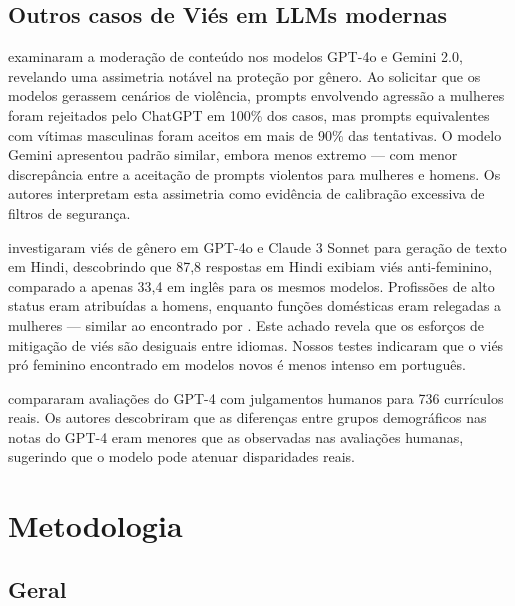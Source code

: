 \documentclass[12pt,a4paper]{article}
\begin{document}
\subsection{Outros casos de Viés em LLMs modernas}


\citet{balestri2024,balestri2025} examinaram a moderação de conteúdo nos modelos GPT-4o
e Gemini 2.0, revelando uma assimetria notável na proteção por gênero.
Ao solicitar que os modelos gerassem cenários de violência, prompts
envolvendo agressão a mulheres foram rejeitados pelo ChatGPT em 100\% dos
casos, mas prompts equivalentes com vítimas masculinas foram aceitos em
mais de 90\% das tentativas. O modelo Gemini apresentou padrão similar,
embora menos extremo --- com menor discrepância entre a aceitação de
prompts violentos para mulheres e homens. Os autores interpretam esta
assimetria como evidência de calibração excessiva de filtros de
segurança.

\citet{joshi2024} investigaram viés de gênero em GPT-4o e Claude 3
Sonnet para geração de texto em Hindi, descobrindo que 87,8%
respostas em Hindi exibiam viés anti-feminino, comparado a apenas 33,4%
em inglês para os mesmos modelos. Profissões de alto status eram
atribuídas a homens, enquanto funções domésticas eram relegadas a
mulheres --- similar ao encontrado por \citet{lucy2021}. Este achado
revela que os esforços de mitigação de viés são desiguais entre idiomas.
Nossos testes indicaram que o viés pró feminino encontrado em modelos
novos é menos intenso em português.

\citet{vaishampayan2025} compararam avaliações do GPT-4 com
julgamentos humanos para 736 currículos reais. Os autores descobriram
que as diferenças entre grupos demográficos nas notas do GPT-4 eram
menores que as observadas nas avaliações humanas, sugerindo que o modelo
pode atenuar disparidades reais.


\section{Metodologia}





\subsection{Geral}
\end{document}
